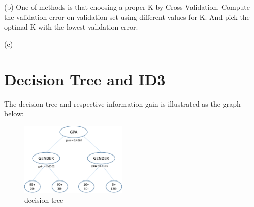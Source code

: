 \documentclass[11pt]{article} %
\begin{document}
(b) 
One of methods is that choosing a proper K by Cross-Validation. Compute the validation error on validation set using different values for K. And pick the optimal K with the lowest validation error.

(c)

\section{Decision Tree and ID3}
The decision tree and respective information gain is illustrated as the graph below:

\begin{figure}[h]
\centering
\includegraphics[width=2in]{tree.png}  %
\caption{decision tree}
\label{fig4}
\end{figure}
\end{document}
